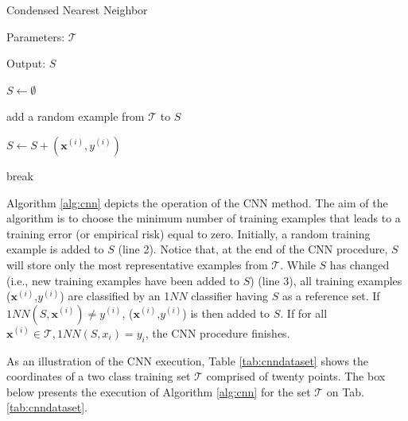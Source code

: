\begin{algorithm}[H]
    \label{alg:cnn}
    \caption{Condensed Nearest Neighbor}
    
    Parameters: $\mathcal{T}$
    
    Output: $S$
    
    \begin{algorithmic}[1] 
    
    \STATE $S \gets \emptyset$
   
    \STATE add a random example from $\mathcal{T}$ to $S$
   
        
    
                
                \STATE $S \gets S + (\mathbf{x}^{(i)}, y^{(i)})$
                
                \STATE break
                    
            \ENDIF
        \ENDFOR
        
    \ENDWHILE
  
  \end{algorithmic}
  
\end{algorithm}

\vspace{0.2cm}

Algorithm \ref{alg:cnn} depicts the operation of the CNN method. The aim of the algorithm is to choose the minimum number of training examples that leads to a training error (or empirical risk) equal to zero. Initially, a random training example is added to $S$ (line 2). Notice that, at the end of the CNN procedure, $S$ will store only the most representative examples from $\mathcal{T}$. While $S$ has changed (i.e., new training examples have been added to $S$) (line 3), all training examples ($\mathbf{x}^{(i)}$,$y^{(i)}$) are classified by an 1$NN$ classifier having $S$ as a reference set. If $1NN(S, \mathbf{x}^{(i)}) \neq y^{(i)}$, ($\mathbf{x}^{(i)}$,$y^{(i)}$) is then added to $S$. If for all $\mathbf{x}^{(i)} \in \mathcal{T}, 1NN(S, x_i) = y_i$, the CNN procedure finishes. 

As an illustration of the CNN execution, Table \ref{tab:cnndataset} shows the coordinates of a two class training set $\mathcal{T}$ comprised of twenty points. The box below presents the execution of Algorithm \ref{alg:cnn} for the set $\mathcal{T}$ on Tab. \ref{tab:cnndataset}.

